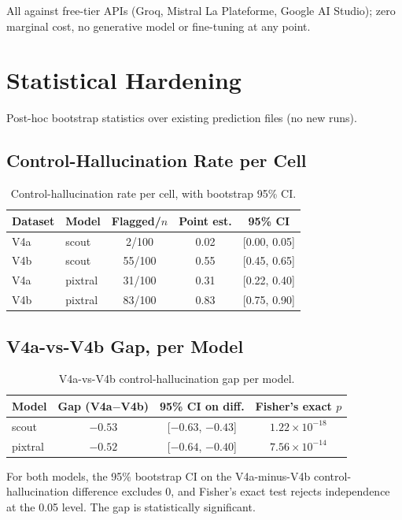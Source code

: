 \documentclass{ieeeaccess}
\begin{document}
All against free-tier APIs (Groq, Mistral La Plateforme, Google AI Studio);
zero marginal cost, no generative model or fine-tuning at any point.

\section{Statistical Hardening}
Post-hoc bootstrap statistics over existing prediction files (no new runs).

\subsection{Control-Hallucination Rate per Cell}
\begin{table}[h]
\caption{Control-hallucination rate per cell, with bootstrap 95\% CI.}
\label{tab:halluccell}
\centering
\small
\begin{tabular}{|l|l|c|c|c|}
\hline
Dataset & Model & Flagged/$n$ & Point est. & 95\% CI \\
\hline
V4a & scout & 2/100 & 0.02 & [0.00, 0.05] \\
V4b & scout & 55/100 & 0.55 & [0.45, 0.65] \\
V4a & pixtral & 31/100 & 0.31 & [0.22, 0.40] \\
V4b & pixtral & 83/100 & 0.83 & [0.75, 0.90] \\
\hline
\end{tabular}
\end{table}

\subsection{V4a-vs-V4b Gap, per Model}
\begin{table}[h]
\caption{V4a-vs-V4b control-hallucination gap per model.}
\label{tab:gapmodel}
\centering
\small
\begin{tabular}{|l|c|c|c|}
\hline
Model & Gap (V4a$-$V4b) & 95\% CI on diff. & Fisher's exact $p$ \\
\hline
scout & $-0.53$ & [$-0.63$, $-0.43$] & $1.22\times10^{-18}$ \\
pixtral & $-0.52$ & [$-0.64$, $-0.40$] & $7.56\times10^{-14}$ \\
\hline
\end{tabular}
\end{table}

For both models, the 95\% bootstrap CI on the V4a-minus-V4b
control-hallucination difference excludes 0, and Fisher's exact test rejects
independence at the 0.05 level. The gap is statistically significant.
\end{document}
